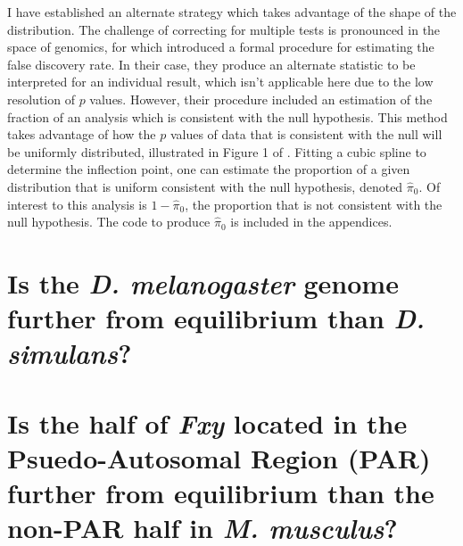 I have established an alternate strategy which takes advantage of the shape of the distribution. The challenge of correcting for multiple tests is pronounced in the space of genomics, for which \cite{Storey2003StatisticalStudies} introduced a formal procedure for estimating the false discovery rate. In their case, they produce an alternate statistic to be interpreted for an individual result, which isn't applicable here due to the low resolution of $p$ values. However, their procedure included an estimation of the fraction of an analysis which is consistent with the null hypothesis. This method takes advantage of how the $p$ values of data that is consistent with the null will be uniformly distributed, illustrated in Figure 1 of \cite{Storey2003StatisticalStudies}. Fitting a cubic spline to determine the inflection point, one can estimate the proportion of a given distribution that is uniform consistent with the null hypothesis, denoted $\hat \pi_{0}$. Of interest to this analysis is $1 -\hat \pi_{0}$, the proportion that is not consistent with the null hypothesis. The code to produce $\hat \pi_{0}$ is included in the appendices. 

\section{Is the \textit{D. melanogaster} genome further from equilibrium than \textit{D. simulans}?}
 
\section{Is the half of \textit{Fxy} located in the Psuedo-Autosomal Region (PAR) further from equilibrium than the non-PAR half in \textit{M. musculus}?}